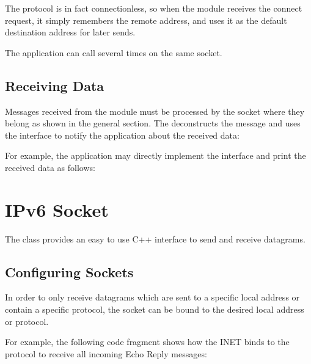 
The  protocol is in fact connectionless, so when the
 module receives the connect request, it simply remembers the
remote address, and uses it as the default destination address for later sends.

The application can call  several times on the same socket.

\subsection*{Receiving Data}

Messages received from the  module must be processed by the socket
where they belong as shown in the general section. The 
deconstructs the message and uses the  interface
to notify the application about the received data:


For example, the application may directly implement the
 interface and print the received data as
follows:


\section{IPv6 Socket}

The  class provides an easy to use C++ interface to send
and receive  datagrams.

\subsection*{Configuring Sockets}

In order to only receive  datagrams which are sent to a specific
local address or contain a specific protocol, the socket can be bound to the
desired local address or protocol.

For example, the following code fragment shows how the INET 
binds to the  protocol to receive all incoming
 Echo Reply messages:


